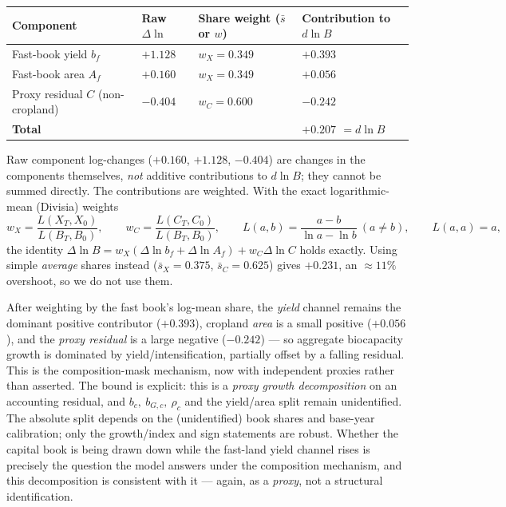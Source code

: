 \documentclass[11pt]{article}
\begin{document}
\begin{center}
\small
\begin{tabular}{llll}
\toprule
Component & Raw $\Delta\ln$ & Share weight ($\bar s$ or $w$) & \textbf{Contribution to $d\ln B$} \\
\midrule
Fast-book yield $b_f$ & $+1.128$ & $w_X=0.349$ & \textbf{$+0.393$} \\
Fast-book area $A_f$ & $+0.160$ & $w_X=0.349$ & \textbf{$+0.056$} \\
Proxy residual $C$ (non-cropland) & $-0.404$ & $w_C=0.600$ & \textbf{$-0.242$} \\
\midrule
\textbf{Total} & & & \textbf{$+0.207$ $=d\ln B$} \\
\bottomrule
\end{tabular}
\par\vspace{2pt}
{\footnotesize Raw component log-changes ($+0.160$, $+1.128$, $-0.404$) are changes in the components
themselves, \emph{not} additive contributions to $d\ln B$; they cannot be summed directly. The contributions are
weighted. With the exact logarithmic-mean (Divisia) weights
\[
w_X=\frac{L(X_T,X_0)}{L(B_T,B_0)},\qquad w_C=\frac{L(C_T,C_0)}{L(B_T,B_0)},\qquad
L(a,b)=\frac{a-b}{\ln a-\ln b}\ (a\neq b),\qquad L(a,a)=a,
\]
the identity $\Delta\ln B=w_X(\Delta\ln b_f+\Delta\ln A_f)+w_C\Delta\ln C$ holds exactly. Using simple
\emph{average} shares instead ($\bar s_X=0.375$, $\bar s_C=0.625$) gives $+0.231$, an $\approx11\%$ overshoot, so
we do not use them.}
\end{center}

After weighting by the fast book's log-mean share, the \emph{yield} channel remains the dominant positive
contributor ($+0.393$), cropland \emph{area} is a small positive ($+0.056$), and the \emph{proxy residual} is a
large negative ($-0.242$) --- so aggregate biocapacity growth is dominated by yield/intensification, partially
offset by a falling residual. This is the composition-mask mechanism, now with independent proxies rather than
asserted. The bound is explicit: this is a \emph{proxy growth decomposition} on an accounting residual, and
$b_c,\ b_{G,c},\ \rho_c$ and the yield/area split remain unidentified. The absolute split depends on the
(unidentified) book shares and base-year calibration; only the growth/index and sign statements are robust.
Whether the capital book is being drawn down while the fast-land yield channel rises is precisely the question
the model answers under the composition mechanism, and this decomposition is consistent with it --- again, as a \emph{proxy}, not a structural identification.
\end{document}
